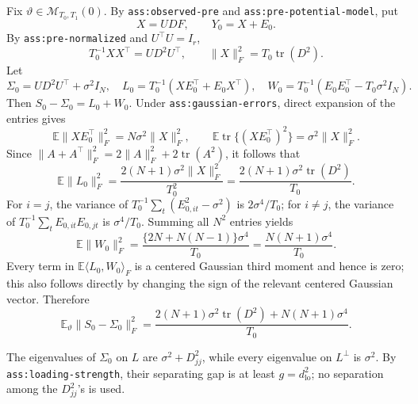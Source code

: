 Fix \(\vartheta\in\mathcal M_{T_0,T_1}(0)\).  By \texttt{ass:observed-pre} and \texttt{ass:pre-potential-model}, put
\[
 X=UDF,
 \qquad
 Y_0=X+E_0.
\]
By \texttt{ass:pre-normalized} and \(U^{\top}U=I_r\),
\[
 T_0^{-1}XX^{\top}=UD^2U^{\top},
 \qquad
 \lVert X\rVert_F^2=T_0\operatorname{tr}(D^2).
\]
Let
\[
 \Sigma_0=UD^2U^{\top}+\sigma^2I_N,
 \quad
 L_0=T_0^{-1}(XE_0^{\top}+E_0X^{\top}),
 \quad
 W_0=T_0^{-1}(E_0E_0^{\top}-T_0\sigma^2I_N).
\]
Then \(S_0-\Sigma_0=L_0+W_0\).  Under \texttt{ass:gaussian-errors}, direct expansion of the entries gives
\[
 \mathbb E\lVert XE_0^{\top}\rVert_F^2
   =N\sigma^2\lVert X\rVert_F^2,
 \qquad
 \mathbb E\operatorname{tr}\{(XE_0^{\top})^2\}
   =\sigma^2\lVert X\rVert_F^2.
\]
Since \(\lVert A+A^{\top}\rVert_F^2=2\lVert A\rVert_F^2+2\operatorname{tr}(A^2)\), it follows that
\[
 \mathbb E\lVert L_0\rVert_F^2
 =\frac{2(N+1)\sigma^2\lVert X\rVert_F^2}{T_0^2}
 =\frac{2(N+1)\sigma^2\operatorname{tr}(D^2)}{T_0}.
\]
For \(i=j\), the variance of \(T_0^{-1}\sum_t(E_{0,it}^2-\sigma^2)\) is \(2\sigma^4/T_0\); for \(i\ne j\), the variance of \(T_0^{-1}\sum_tE_{0,it}E_{0,jt}\) is \(\sigma^4/T_0\).  Summing all \(N^2\) entries yields
\[
 \mathbb E\lVert W_0\rVert_F^2
 =\frac{\{2N+N(N-1)\}\sigma^4}{T_0}
 =\frac{N(N+1)\sigma^4}{T_0}.
\]
Every term in \(\mathbb E\langle L_0,W_0\rangle_F\) is a centered Gaussian third moment and hence is zero; this also follows directly by changing the sign of the relevant centered Gaussian vector.  Therefore
\[
 \mathbb E_\vartheta\lVert S_0-\Sigma_0\rVert_F^2
 =\frac{2(N+1)\sigma^2\operatorname{tr}(D^2)+N(N+1)\sigma^4}{T_0}.
\]

The eigenvalues of \(\Sigma_0\) on \(L\) are \(\sigma^2+D_{jj}^2\), while every eigenvalue on \(L^{\perp}\) is \(\sigma^2\).  By \texttt{ass:loading-strength}, their separating gap is at least \(g=d_{\mathrm{lo}}^2\); no separation among the \(D_{jj}^2\)'s is used.

